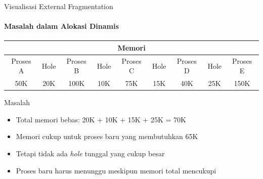 \documentclass[10pt,aspectratio=169]{beamer}
\begin{document}
\begin{frame}{Visualisasi External Fragmentation}
    \framesubtitle{Masalah dalam Alokasi Dinamis}
    
    \begin{center}
        \begin{tabular}{|c|c|c|c|c|c|c|c|c|}
        \hline
        \multicolumn{9}{|c|}{Memori} \\
        \hline
        Proses A & \cellcolor{gray!30}Hole & Proses B & \cellcolor{gray!30}Hole & Proses C & \cellcolor{gray!30}Hole & Proses D & \cellcolor{gray!30}Hole & Proses E \\
        \hline
        50K & 20K & 100K & 10K & 75K & 15K & 40K & 25K & 150K \\
        \hline
        \end{tabular}
    \end{center}
    
    \begin{alertblock}{Masalah}
        \begin{itemize}
            \item Total memori bebas: 20K + 10K + 15K + 25K = 70K
            \item Memori cukup untuk proses baru yang membutuhkan 65K
            \item Tetapi tidak ada \textit{hole} tunggal yang cukup besar
            \item Proses baru harus menunggu meskipun memori total mencukupi
        \end{itemize}
    \end{alertblock}
\end{frame}
\end{document}
